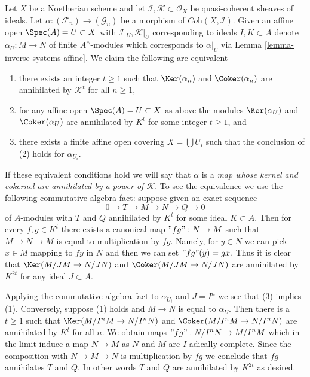 \begin{remark}
\label{remark-inverse-systems-kernel-cokernel-annihilated-by}
Let $X$ be a Noetherian scheme and let
$\mathcal{I}, \mathcal{K} \subset \mathcal{O}_X$
be quasi-coherent sheaves of ideals. Let
$\alpha : (\mathcal{F}_n) \to (\mathcal{G}_n)$ be a morphism of
$\textit{Coh}(X, \mathcal{I})$.
Given an affine open $\Spec(A) = U \subset X$ with
$\mathcal{I}|_U, \mathcal{K}|_U$ corresponding to ideals $I, K \subset A$
denote $\alpha_U : M \to N$ of finite $A^\wedge$-modules which
corresponds to $\alpha|_U$ via Lemma \ref{lemma-inverse-systems-affine}.
We claim the following are equivalent
\begin{enumerate}
\item there exists an integer $t \geq 1$ such that
$\Ker(\alpha_n)$ and $\Coker(\alpha_n)$
are annihilated by $\mathcal{K}^t$ for all $n \geq 1$,
\item for any affine open $\Spec(A) = U \subset X$ as above
the modules $\Ker(\alpha_U)$ and $\Coker(\alpha_U)$
are annihilated by $K^t$ for some integer $t \geq 1$, and
\item there exists a finite affine open covering $X = \bigcup U_i$
such that the conclusion of (2) holds for $\alpha_{U_i}$.
\end{enumerate}
If these equivalent conditions hold we will say that
$\alpha$ is a
{\it map whose kernel and cokernel are annihilated by a power of
$\mathcal{K}$}.
To see the equivalence we use the following commutative algebra fact:
suppose given an exact sequence
$$
0 \to T \to M \to N \to Q \to 0
$$
of $A$-modules with $T$ and $Q$ annihilated by $K^t$ for some
ideal $K \subset A$. Then for every $f, g \in K^t$ there exists a
canonical map $"fg": N \to M$ such that $M \to N \to M$ is equal to
multiplication by $fg$. Namely, for $y \in N$ we can pick $x \in M$
mapping to $fy$ in $N$ and then we can set $"fg"(y) = gx$. Thus it is
clear that $\Ker(M/JM \to N/JN)$ and $\Coker(M/JM \to N/JN)$
are annihilated by $K^{2t}$ for any ideal $J \subset A$.

\medskip\noindent
Applying the commutative algebra fact to $\alpha_{U_i}$ and $J = I^n$
we see that (3) implies (1). Conversely,
suppose (1) holds and $M \to N$ is equal to $\alpha_U$. Then there is
a $t \geq 1$ such that
$\Ker(M/I^nM \to N/I^nN)$ and $\Coker(M/I^nM \to N/I^nN)$
are annihilated by $K^t$ for all $n$. We obtain maps
$"fg" : N/I^nN \to M/I^nM$ which in the limit induce a map $N \to M$
as $N$ and $M$ are $I$-adically complete. Since the composition with
$N \to M \to N$ is multiplication by $fg$ we conclude that $fg$
annihilates $T$ and $Q$. In other words $T$ and $Q$ are annihilated by
$K^{2t}$ as desired.
\end{remark}


